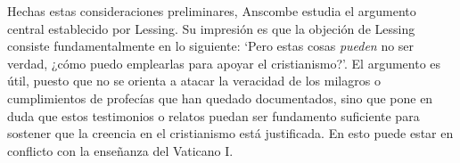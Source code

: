 

Hechas estas consideraciones preliminares, Anscombe estudia el argumento central establecido por Lessing. Su impresión es que la objeción de Lessing consiste fundamentalmente en lo siguiente: \enquote*{Pero estas cosas \emph{pueden} no ser verdad, ¿cómo puedo emplearlas para apoyar el cristianismo?}. El argumento es útil, puesto que no se orienta a atacar la veracidad de los milagros o cumplimientos de profecías que han quedado documentados, sino que pone en duda que estos testimonios o relatos puedan ser fundamento suficiente para sostener que la creencia en el cristianismo está justificada. En esto puede estar en conflicto con la enseñanza del Vaticano I.


